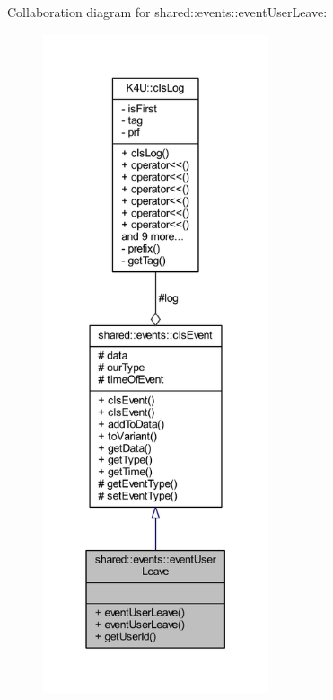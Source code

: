 Collaboration diagram for shared\-:\-:events\-:\-:event\-User\-Leave\-:\nopagebreak
\begin{figure}[H]
\begin{center}
\leavevmode
\includegraphics[height=550pt]{dd/d0c/classshared_1_1events_1_1event_user_leave__coll__graph}
\end{center}
\end{figure}
